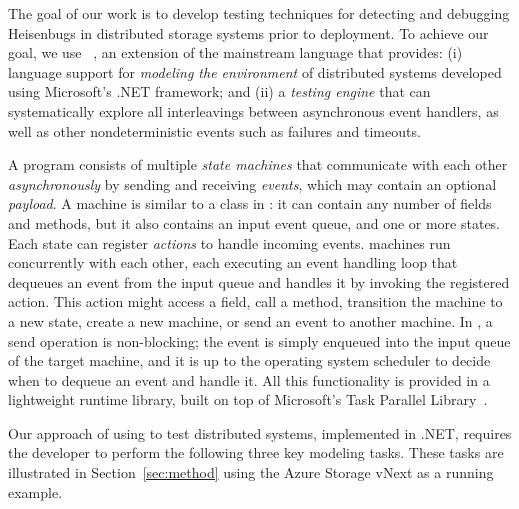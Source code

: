 The goal of our work is to develop testing techniques for detecting and debugging Heisenbugs in distributed storage systems prior to deployment. To achieve our goal, we use \psharp~\cite{deligiannis2015psharp}, an extension of the mainstream \csharp language that provides: (i) language support for \emph{modeling the environment} of distributed systems developed using Microsoft's .NET framework; and (ii) a \emph{testing engine} that can systematically explore all interleavings between asynchronous event handlers, as well as other nondeterministic events such as failures and timeouts.

A \psharp program consists of multiple \emph{state machines} that communicate with each other \emph{asynchronously} by sending and receiving \emph{events}, which may contain an optional \emph{payload}. A \psharp machine is similar to a class in \csharp: it can contain any number of fields and methods, but it also contains an input event queue, and one or more states. Each state can register \emph{actions} to handle incoming events. \psharp machines run concurrently with each other, each executing an event handling loop that dequeues an event from the input queue and handles it by invoking the registered action. This action might access a field, call a method, transition the machine to a new state, create a new machine, or send an event to another machine. In \psharp, a send operation is non-blocking; the event is simply enqueued into the input queue of the target machine, and it is up to the operating system scheduler to decide when to dequeue an event and handle it. All this functionality is provided in a lightweight runtime library, built on top of Microsoft's Task Parallel Library~\cite{leijen2009tpl}.

Our approach of using \psharp to test distributed systems, implemented in .NET, requires the developer to perform the following three key modeling tasks. These tasks are illustrated in Section~\ref{sec:method} using the Azure Storage vNext as a running example.

